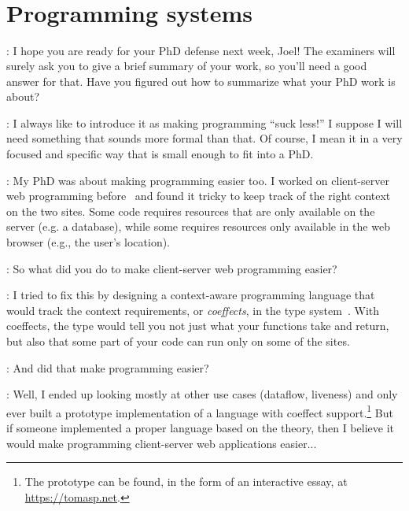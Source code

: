 \documentclass[runningheads]{llncs}
\newcommand{\T}{Tomas}
\newcommand{\J}{Joel}
\newcommand{\says}[2][gg]{\vspace{0.5em}\noindent\hangindent=0.5cm{\textsc{#1}}: #2}
\begin{document}
~

~

~

~

\section{Programming systems}

\says[\T]{I hope you are ready for your PhD defense next week, Joel! The examiners will surely ask you to give a brief summary of your work, so you'll need a good answer for that. Have you figured out how to summarize what your PhD work is about?}

\says[\J]{I always like to introduce it as making programming ``suck less!'' I suppose I will need something that sounds more formal than that. Of course, I mean it in a very focused and specific way that is small enough to fit into a PhD.}

\says[\T]{My PhD was about making programming easier too. I worked on client-server web programming before~\cite{petricek-2007-fswebtools} and found it tricky to keep track of the right context on the two sites. Some code requires resources that are only available on the server (e.g. a database), while some requires resources only available in the web browser (e.g., the user's location).}

\says[\J]{So what did you do to make client-server web programming easier?}

\says[\T]{I tried to fix this by designing a context-aware programming language that would track the context requirements, or \emph{coeffects}, in the type system~\cite{petricek-2013-coeffects}. With coeffects, the type would tell you not just what your functions take and return, but also that some part of your code can run only on some of the sites.}

\says[\J]{And did that make programming easier?}

\says[\T]{Well, I ended up looking mostly at other use cases (dataflow, liveness) and only ever built a prototype implementation of a  language with coeffect support.\footnote{The prototype can be found, in the form of an interactive essay, at \url{https://tomasp.net}.} But if someone implemented a proper language based on the theory, then I believe it would make programming client-server web applications easier...}
\end{document}
